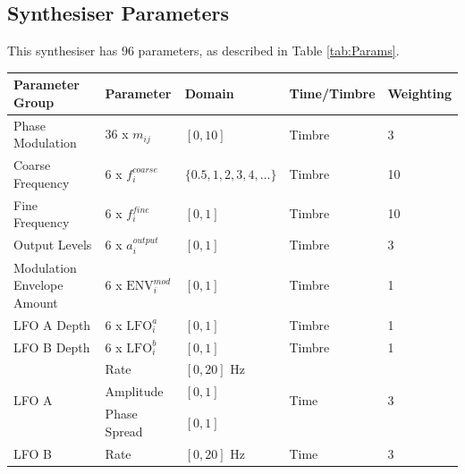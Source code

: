 \documentclass[11pt, oneside]{report}   	%
\begin{document}
\subsection{Synthesiser Parameters}
This synthesiser has 96 parameters, as described in Table \ref{tab:Params}.

\def\arraystretch{1.5}
\begin{table}[]
	\hspace{-2em}
	\begin{tabular}{|l|l|l|l|l|}
		\hline
		\textbf{Parameter Group}                	 & \textbf{Parameter}     & \textbf{Domain}            & \textbf{Time/Timbre} & \textbf{Weighting} \\ \hline
		Phase Modulation         						& 36 x $m_{ij}$               & $[0, 10]$                  		& Timbre                	& 3									\\ \hline
		Coarse Frequency                            	& 6 x $f_{i}^{coarse}$     & $\{0.5, 1, 2, 3, 4, ...\}$ & Timbre                	& 10									  \\ \hline
		Fine Frequency                                 	   & 6 x $f_{i}^{fine}$         & $[0, 1]$                   		& Timbre                	& 10									  \\ \hline
		Output Levels                                  		& 6 x $a_{i}^{output}$     & $[0, 1]$                   	  & Timbre                	& 3								    	\\ \hline
Modulation Envelope Amount                       & 6 x $\mathrm{ENV}_{i}^{mod}$   & $[0, 1]$                   	     & Timbre                  & 1		  \\ \hline
		LFO A Depth                                    		& 6 x $\mathrm{LFO}_{i}^{a}$         & $[0, 1]$                   	   & Timbre                  & 1				\\ \hline
		LFO B Depth                                    		& 6 x $\mathrm{LFO}_{i}^{b}$        & $[0, 1]$                   	   & Timbre                  & 1				\\ \hline
		\multirow{3}{*}{LFO A}      					& Rate                    		& $[0, 20]$ Hz               	 & \multirow{3}{*}{Time}& \multirow{3}{*}{3} \\
																	  & Amplitude               	& $[0, 1]$                   		&                      				& \\
																	  & Phase Spread         	& $[0, 1]$                   		&                       			&\\ \hline
		\multirow{3}{*}{LFO B}      					& Rate                    		& $[0, 20]$ Hz               	& \multirow{3}{*}{Time}& \multirow{3}{*}{3} \\

\end{tabular}
\end{table}
\end{document}
